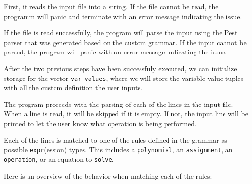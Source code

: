 First, it reads the input file into a string. If the file cannot be read, the programm will panic and terminate with an error message indicating the issue.

If the file is read successfully, the program will parse the input using the Pest parser that was generated based on the custom grammar. If the input cannot be parsed, the program will panic with an error message indicating the issue.

After the two previous steps have been successfuly executed, we can initialize storage for the vector \verb|var_values|, where we will store the variable-value tuples with all the custom definition the user inputs.

The program proceeds with the parsing of each of the lines in the input file. When a line is read, it will be skipped if it is empty. If not, the input line will be printed to let the user know what operation is being performed.

Each of the lines is matched to one of the rules defined in the grammar as possible \verb|expr|(ession) types. This includes a \verb|polynomial|, an \verb|assignment|, an \verb|operation|, or an equation to \verb|solve|.

Here is an overview of the behavior when matching each of the rules:

